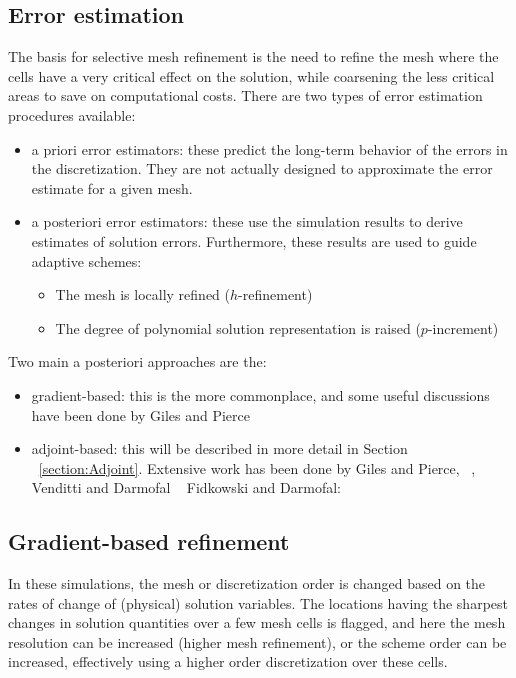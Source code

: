\subsection{Error estimation}
The basis for selective mesh refinement is the need to refine the mesh where the cells have a very critical effect on the solution, while coarsening the less critical areas to save on computational costs. There are two types of error estimation procedures available:
\begin{itemize}
\item a priori error estimators: these predict the long-term behavior of the errors in the discretization. They are not actually designed to approximate the error estimate for a given mesh. 
\item a posteriori error estimators: these use the simulation results to derive estimates of solution errors. Furthermore, these results are used to guide adaptive schemes:
\begin{itemize}
\item The mesh is locally refined ($h$-refinement) 
\item The degree of polynomial solution representation is raised ($p$-increment)
\end{itemize}
\end{itemize}
Two main a posteriori approaches are the:
\begin{itemize}
\item gradient-based: this is the more commonplace, and some useful discussions have been done by Giles and Pierce ~\cite{Giles:2000}
\item adjoint-based: this will be described in more detail in Section ~\ref{section:Adjoint}. Extensive work has been done by Giles and Pierce, ~\cite{Giles:2000}, Venditti and Darmofal ~\cite{Venditti:2000, Venditti:2002, Venditti:2003} Fidkowski and Darmofal: ~\cite{Fidkowski:2011} 
\end{itemize}


\subsection{Gradient-based refinement}

In these simulations, the mesh or discretization order is changed based on the rates of change of (physical) solution variables. The locations having the sharpest changes in solution quantities over a few mesh cells is flagged, and here the mesh resolution can be increased (higher mesh refinement), or the scheme order can be increased, effectively using a higher order discretization over these cells.

